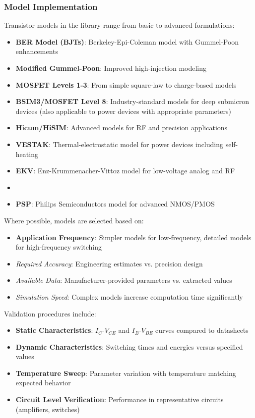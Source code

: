 \subsubsection{Model Implementation}
Transistor models in the library range from basic to advanced formulations:

\begin{itemize}
    \item \textbf{BER Model (BJTs)}: Berkeley-Epi-Coleman model with Gummel-Poon enhancements
    \item \textbf{Modified Gummel-Poon}: Improved high-injection modeling
    \item \textbf{MOSFET Levels 1-3}: From simple square-law to charge-based models
    \item \textbf{BSIM3/MOSFET Level 8}: Industry-standard models for deep submicron devices (also applicable to power devices with appropriate parameters)
    \item \textbf{Hicum/HiSIM}: Advanced models for RF and precision applications
    \item \textbf{VESTAK}: Thermal-electrostatic model for power devices including self-heating
    \item \textbf{EKV}: Enz-Krummenacher-Vittoz model for low-voltage analog and RF
    \item \item \textbf{PSP}: Philips Semiconductors model for advanced NMOS/PMOS
\end{itemize}

Where possible, models are selected based on:
\begin{itemize}
    \item \textbf{Application Frequency}: Simpler models for low-frequency, detailed models for high-frequency switching
    \item \textit{Required Accuracy}: Engineering estimates vs. precision design
    \item \textit{Available Data}: Manufacturer-provided parameters vs. extracted values
    \item \textit{Simulation Speed}: Complex models increase computation time significantly
\end{itemize}

Validation procedures include:
\begin{itemize}
    \item \textbf{Static Characteristics}: $I_C$-$V_{CE}$ and $I_B$-$V_{BE}$ curves compared to datasheets
    \item \textbf{Dynamic Characteristics}: Switching times and energies versus specified values
    \item \textbf{Temperature Sweep}: Parameter variation with temperature matching expected behavior
    \item \textbf{Circuit Level Verification}: Performance in representative circuits (amplifiers, switches)
\end{itemize}

